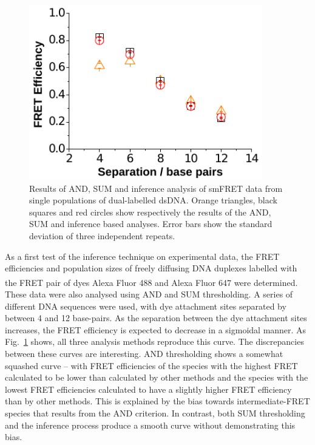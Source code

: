 \begin{figure}
   \begin{center}
      \includegraphics*[width=4in]{inference/fig6_single_ppltn.pdf}
      \caption{Results of AND, SUM and inference analysis of smFRET data from single populations of dual-labelled dsDNA. Orange triangles, black squares and red circles show respectively the results of the AND, SUM and inference based analyses. Error bars show the standard deviation of three independent repeats.}
      \label{fig:fig6_real_single}
   \end{center}
\end{figure}

As a first test of the inference technique on experimental data, the FRET efficiencies and population sizes of freely diffusing DNA duplexes labelled with the FRET pair of dyes Alexa Fluor\textsuperscript{\textregistered} 488 and Alexa Fluor\textsuperscript{\textregistered} 647 were determined. These data were also analysed using AND and SUM thresholding. A series of different DNA sequences were used, with dye attachment sites separated by between 4 and 12 base-pairs. As the separation between the dye attachment sites increases, the FRET efficiency is expected to decrease in a sigmoidal manner. As Fig.~\ref{fig:fig6_real_single} shows, all three analysis methods reproduce this curve. The discrepancies between these curves are interesting. AND thresholding shows a somewhat squashed curve -- with FRET efficiencies of the species with the highest FRET calculated to be lower than calculated by other methods and the species with the lowest FRET efficiencies calculated to have a slightly higher FRET efficiency than by other methods. This is explained by the bias towards intermediate-FRET species that results from the AND criterion. In contrast, both SUM thresholding and the inference process produce a smooth curve without demonstrating this bias. 

